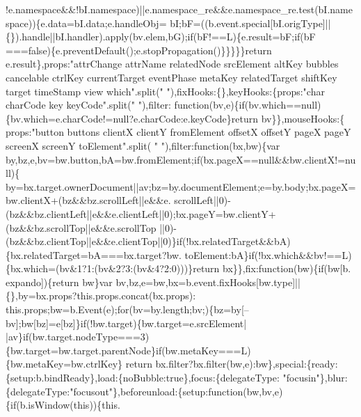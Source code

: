 \begin{DoxyCode}
      !e.namespace&&!bI.namespace)||e.namespace\_re&&e.namespace\_re.test(bI.namespace))\{e.data=bI.data;e.handleObj=
      bI;bF=((b.event.special[bI.origType]||\{\}).handle||bI.handler).apply(bv.elem,bG);\textcolor{keywordflow}{if}(bF!==L)\{e.result=bF;\textcolor{keywordflow}{if}(bF
      ===\textcolor{keyword}{false})\{e.preventDefault();e.stopPropagation()\}\}\}\}\}\textcolor{keywordflow}{return} e.result\},props:\textcolor{stringliteral}{"attrChange attrName relatedNode
       srcElement altKey bubbles cancelable ctrlKey currentTarget eventPhase metaKey relatedTarget shiftKey target
       timeStamp view which"}.split(\textcolor{stringliteral}{" "}),fixHooks:\{\},keyHooks:\{props:\textcolor{stringliteral}{"char charCode key keyCode"}.split(\textcolor{stringliteral}{" "}),filter:\textcolor{keyword}{
      function}(bv,e)\{\textcolor{keywordflow}{if}(bv.which==null)\{bv.which=e.charCode!=null?e.charCode:e.keyCode\}\textcolor{keywordflow}{return} bv\}\},mouseHooks:\{
      props:\textcolor{stringliteral}{"button buttons clientX clientY fromElement offsetX offsetY pageX pageY screenX screenY toElement"}.split(\textcolor{stringliteral}{
      " "}),filter:\textcolor{keyword}{function}(bx,bw)\{var by,bz,e,bv=bw.button,bA=bw.fromElement;\textcolor{keywordflow}{if}(bx.pageX==null&&bw.clientX!=null)\{
      by=bx.target.ownerDocument||av;bz=by.documentElement;e=by.body;bx.pageX=bw.clientX+(bz&&bz.scrollLeft||e&&e.
      scrollLeft||0)-(bz&&bz.clientLeft||e&&e.clientLeft||0);bx.pageY=bw.clientY+(bz&&bz.scrollTop||e&&e.scrollTop
      ||0)-(bz&&bz.clientTop||e&&e.clientTop||0)\}\textcolor{keywordflow}{if}(!bx.relatedTarget&&bA)\{bx.relatedTarget=bA===bx.target?bw.
      toElement:bA\}\textcolor{keywordflow}{if}(!bx.which&&bv!==L)\{bx.which=(bv&1?1:(bv&2?3:(bv&4?2:0)))\}\textcolor{keywordflow}{return} bx\}\},fix:\textcolor{keyword}{function}(bw)\{\textcolor{keywordflow}{if}(bw[b.
      expando])\{\textcolor{keywordflow}{return} bw\}var bv,bz,e=bw,bx=b.event.fixHooks[bw.type]||\{\},by=bx.props?this.props.concat(bx.props):
      this.props;bw=b.Event(e);\textcolor{keywordflow}{for}(bv=by.length;bv;)\{bz=by[--bv];bw[bz]=e[bz]\}\textcolor{keywordflow}{if}(!bw.target)\{bw.target=e.srcElement|
      |av\}\textcolor{keywordflow}{if}(bw.target.nodeType===3)\{bw.target=bw.target.parentNode\}\textcolor{keywordflow}{if}(bw.metaKey===L)\{bw.metaKey=bw.ctrlKey\}\textcolor{keywordflow}{
      return} bx.filter?bx.filter(bw,e):bw\},special:\{ready:\{setup:b.bindReady\},load:\{noBubble:\textcolor{keyword}{true}\},focus:\{delegateType:\textcolor{stringliteral}{
      "focusin"}\},blur:\{delegateType:\textcolor{stringliteral}{"focusout"}\},beforeunload:\{setup:\textcolor{keyword}{function}(bw,bv,e)\{\textcolor{keywordflow}{if}(b.isWindow(\textcolor{keyword}{this}))\{this.

\end{DoxyCode}
